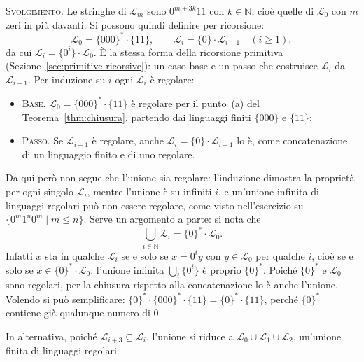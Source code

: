 \documentclass[a4paper, 11pt, oneside]{book}
\theoremstyle{formale}
\begin{document}
    \textsc{Svolgimento}. Le stringhe di $\mathcal{L}_m$ sono $0^{m + 3k} 11$ con
    $k \in \mathbb{N}$, cio\`e quelle di $\mathcal{L}_0$ con $m$ zeri in pi\`u davanti.
    Si possono quindi definire per ricorsione:
    \begin{equation*}
        \mathcal{L}_0 = \{000\}^* \cdot \{11\}, \qquad
        \mathcal{L}_i = \{0\} \cdot \mathcal{L}_{i - 1} \quad (i \geq 1),
    \end{equation*}
    da cui $\mathcal{L}_i = \{0^i\} \cdot \mathcal{L}_0$. \`E la stessa forma della
    ricorsione primitiva (Sezione~\ref{sec:primitive-ricorsive}): un caso base e un passo
    che costruisce $\mathcal{L}_i$ da $\mathcal{L}_{i - 1}$. Per induzione su $i$ ogni
    $\mathcal{L}_i$ \`e regolare:
    \begin{itemize}
        \item[] \textsc{Base}. $\mathcal{L}_0 = \{000\}^* \cdot \{11\}$ \`e regolare per
            il punto~(a) del Teorema~\ref{thm:chiusura}, partendo dai linguaggi finiti
            $\{000\}$ e $\{11\}$;
        \item[] \textsc{Passo}. Se $\mathcal{L}_{i - 1}$ \`e regolare, anche
            $\mathcal{L}_i = \{0\} \cdot \mathcal{L}_{i - 1}$ lo \`e, come concatenazione
            di un linguaggio finito e di uno regolare.
    \end{itemize}
    Da qui per\`o non segue che l'unione sia regolare: l'induzione dimostra la propriet\`a
    per ogni singolo $\mathcal{L}_i$, mentre l'unione \`e su infiniti $i$, e un'unione
    infinita di linguaggi regolari pu\`o non essere regolare, come visto
    nell'esercizio su $\{0^m 1^n 0^m \mid m \leq n\}$. Serve un argomento a parte: si
    nota che
    \begin{equation*}
        \bigcup_{i \in \mathbb{N}} \mathcal{L}_i = \{0\}^* \cdot \mathcal{L}_0.
    \end{equation*}
    Infatti $x$ sta in qualche $\mathcal{L}_i$ se e solo se $x = 0^i y$ con
    $y \in \mathcal{L}_0$ per qualche $i$, cio\`e se e solo se
    $x \in \{0\}^* \cdot \mathcal{L}_0$: l'unione infinita $\bigcup_i \{0^i\}$ \`e
    proprio $\{0\}^*$. Poich\'e $\{0\}^*$ e $\mathcal{L}_0$ sono regolari, per la
    chiusura rispetto alla concatenazione lo \`e anche l'unione. Volendo si pu\`o
    semplificare: $\{0\}^* \cdot \{000\}^* \cdot \{11\} = \{0\}^* \cdot \{11\}$, perch\'e
    $\{0\}^*$ contiene gi\`a qualunque numero di $0$.

    In alternativa, poich\'e $\mathcal{L}_{i + 3} \subseteq \mathcal{L}_i$, l'unione si
    riduce a $\mathcal{L}_0 \cup \mathcal{L}_1 \cup \mathcal{L}_2$, un'unione finita di
    linguaggi regolari.
\end{document}
